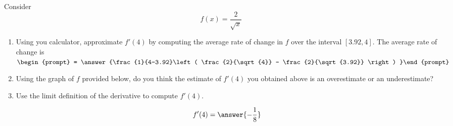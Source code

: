 \documentclass{ximera}
\author{Steven Gubkin}
\begin{document}
\begin{exercise}



Consider 
\[
f(x) = \frac{2}{\sqrt{x}}
\]



\begin{enumerate}
\item Using you calculator, approximate $f'(4)$ by computing the average rate of change in $f$ over the interval $[3.92,4]$.  The average rate of change is  $\begin{prompt} = \answer{\frac{1}{4-3.92}\left( \frac{2}{\sqrt{4}} - \frac{2}{\sqrt{3.92}} \right) }\end{prompt}$
\item Using the graph of $f$ provided below, do you think the estimate of $f'(4)$ you obtained above is an overestimate or an underestimate?

\begin{prompt}
\begin{multipleChoice}
\end{multipleChoice}
\end{prompt}

\begin{image}
\end{image}

\item Use the limit definition of the derivative to compute $f'(4)$.  \begin{prompt}$$f'(4) = \answer{-\frac{1}{8}}$$\end{prompt}
\end{enumerate}
\end{exercise}
\end{document}
